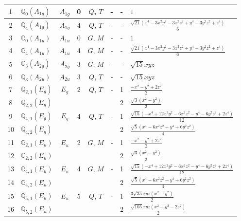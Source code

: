 \documentclass[fleqn,10pt,landscape]{jsarticle}
\begin{document}
\begin{longtable}[l]{clcccccl}
1 & $\mathbb{Q}_{0}(A_{1g})$ & $A_{1g}$ & 0 & $Q$, $T$ & - & - & $1$ \\ \hline
2 & $\mathbb{Q}_{4}(A_{1g})$ & $A_{1g}$ & 4 & $Q$, $T$ & - & - & $\frac{\sqrt{21} \left(x^{4} - 3 x^{2} y^{2} - 3 x^{2} z^{2} + y^{4} - 3 y^{2} z^{2} + z^{4}\right)}{6}$ \\ \hline
3 & $\mathbb{G}_{0}(A_{1u})$ & $A_{1u}$ & 0 & $G$, $M$ & - & - & $1$ \\ \hline
4 & $\mathbb{G}_{4}(A_{1u})$ & $A_{1u}$ & 4 & $G$, $M$ & - & - & $\frac{\sqrt{21} \left(x^{4} - 3 x^{2} y^{2} - 3 x^{2} z^{2} + y^{4} - 3 y^{2} z^{2} + z^{4}\right)}{6}$ \\ \hline
5 & $\mathbb{G}_{3}(A_{2g})$ & $A_{2g}$ & 3 & $G$, $M$ & - & - & $\sqrt{15} x y z$ \\ \hline
6 & $\mathbb{Q}_{3}(A_{2u})$ & $A_{2u}$ & 3 & $Q$, $T$ & - & - & $\sqrt{15} x y z$ \\ \hline
7 & $\mathbb{Q}_{2,1}(E_{g})$ & $E_{g}$ & 2 & $Q$, $T$ & - & 1 & $\frac{- x^{2} - y^{2} + 2 z^{2}}{2}$ \\
8 & $\mathbb{Q}_{2,2}(E_{g})$ &  &  &  &  & 2 & $\frac{\sqrt{3} \left(x^{2} - y^{2}\right)}{2}$ \\ \hline
9 & $\mathbb{Q}_{4,1}(E_{g})$ & $E_{g}$ & 4 & $Q$, $T$ & - & 1 & $\frac{\sqrt{15} \left(- x^{4} + 12 x^{2} y^{2} - 6 x^{2} z^{2} - y^{4} - 6 y^{2} z^{2} + 2 z^{4}\right)}{12}$ \\
10 & $\mathbb{Q}_{4,2}(E_{g})$ &  &  &  &  & 2 & $\frac{\sqrt{5} \left(x^{4} - 6 x^{2} z^{2} - y^{4} + 6 y^{2} z^{2}\right)}{4}$ \\ \hline
11 & $\mathbb{G}_{2,1}(E_{u})$ & $E_{u}$ & 2 & $G$, $M$ & - & 1 & $\frac{- x^{2} - y^{2} + 2 z^{2}}{2}$ \\
12 & $\mathbb{G}_{2,2}(E_{u})$ &  &  &  &  & 2 & $\frac{\sqrt{3} \left(x^{2} - y^{2}\right)}{2}$ \\ \hline
13 & $\mathbb{G}_{4,1}(E_{u})$ & $E_{u}$ & 4 & $G$, $M$ & - & 1 & $\frac{\sqrt{15} \left(- x^{4} + 12 x^{2} y^{2} - 6 x^{2} z^{2} - y^{4} - 6 y^{2} z^{2} + 2 z^{4}\right)}{12}$ \\
14 & $\mathbb{G}_{4,2}(E_{u})$ &  &  &  &  & 2 & $\frac{\sqrt{5} \left(x^{4} - 6 x^{2} z^{2} - y^{4} + 6 y^{2} z^{2}\right)}{4}$ \\ \hline
15 & $\mathbb{Q}_{5,1}(E_{u})$ & $E_{u}$ & 5 & $Q$, $T$ & - & 1 & $\frac{3 \sqrt{35} x y z \left(x^{2} - y^{2}\right)}{2}$ \\
16 & $\mathbb{Q}_{5,2}(E_{u})$ &  &  &  &  & 2 & $\frac{\sqrt{105} x y z \left(x^{2} + y^{2} - 2 z^{2}\right)}{2}$ \\ \hline

\end{longtable}
\end{document}
